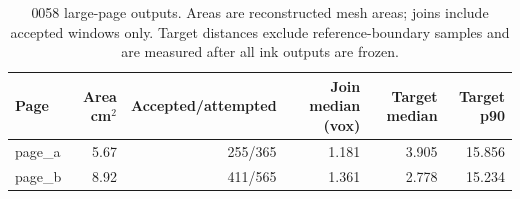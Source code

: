\begin{table}[t]
\centering
\small
\setlength{\tabcolsep}{4pt}
\begin{tabular}{lrrrrr}
\toprule
Page & Area cm$^2$ & Accepted/attempted & Join median (vox) & Target median & Target p90 \\
\midrule
page\_a & 5.67 & 255/365 & 1.181 & 3.905 & 15.856 \\
page\_b & 8.92 & 411/565 & 1.361 & 2.778 & 15.234 \\
\bottomrule
\end{tabular}
\caption{0058 large-page outputs. Areas are reconstructed mesh areas; joins include accepted windows only. Target distances exclude reference-boundary samples and are measured after all ink outputs are frozen.}
\label{tab:largepages}
\end{table}
